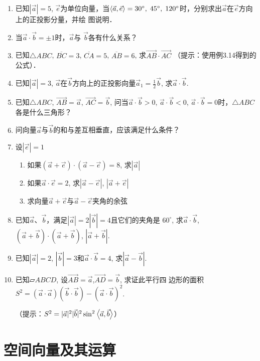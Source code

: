 \begin{enumerate}
    \item  已知$|\vec{a}|=5$, $\vec{e}$为单位向量，当$\left\langle \vec{a},\vec{e} \right\rangle=30^{\circ},\; 45^{\circ},\; 120^{\circ}$时，分别求出$\vec{a}$在$\vec{e}$方向上的正投影分量，并绘
    图说明．
    \item  当$\vec{a}\cdot \vec{b}=\pm 1$时，$\vec{a}$与
    $\vec{b}$各有什么关系？
    \item  已知$\triangle ABC$, $\overline{BC}=3$, $\overline{CA}=5$, $\overline{AB}=6$, 求$\Vec{A B}\cdot \Vec{AC}$
    （提示：使用例3.14得到的公式）．
    \item  已知$|\vec{a}|=3$, $\vec{a}$在$\vec{b}$方向上的正投影向量$\vec{a}_1=\frac{1}{2}\vec{b}$,
    求$\vec{a}\cdot \vec{b}$.
    \item  已知$\triangle ABC$, $\Vec{AB}=\vec{a}$, $\Vec{AC}=\vec{b}$, 问当$\vec{a}\cdot \vec{b}>0$, $\vec{a}\cdot \vec{b}<0$, $\vec{a}\cdot \vec{b}=0$时，$\triangle ABC$各是什么三角形？

    \item  问向量$\vec{a}$与$\vec{b}$的和与差互相垂直，应该满足什么条件？
    \item  设$|\vec{e}|=1$
\begin{enumerate}
    \item 如果$(\vec{a}+\vec{e})\cdot (\vec{a}-\vec{e})=8$, 求$|\vec{a}|$
    \item 如果$\vec{a}\cdot \vec{e}=2$, 求$|\vec{a}-\vec{e}|$, $|\vec{a}+\vec{e}|$
    \item 求向量$\vec{a}+\vec{e}$与$\vec{a}-\vec{e}$夹角的余弦
\end{enumerate}

    \item  已知$\vec{a}$、$\vec{b}$，满足$|\vec{a}|=2|\vec{b}|=4$且它们的夹角是
    $60^{\circ}$, 求$\vec{a}\cdot \vec{b}$, $(\vec{a}+\vec{b})\cdot (\vec{a}+\vec{b})$, $|\vec{a}+\vec{b}|$.
    \item  已知$|\vec{a}|=2$, $|\vec{b}|=3$和$\vec{a}\cdot\vec{b}=4$, 求$|\vec{a}-\vec{b}|$.
    \item  已知$\parallelogram ABCD$, 设$\Vec{AB}=\vec{a}$,$\Vec{AD}=\vec{b}$, 求证此平行四
    边形的面积 $S^2=(\vec{a}\cdot \vec{a})(\vec{b}\cdot \vec{b})-(\vec{a}\cdot \vec{b})^2$.

    （提示：$S^2=|\vec{a}|^2|\vec{b}|^2\sin^2 \left\langle \vec{a},\vec{b} \right\rangle$）
\end{enumerate}

\section{空间向量及其运算}

